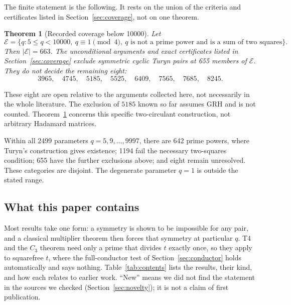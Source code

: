 \documentclass[11pt]{article}
\newtheorem{theorem}{Theorem}[section]
\theoremstyle{definition}
\theoremstyle{remark}
\begin{document}
The finite statement is the following. It rests on the union of the criteria
and certificates listed in Section~\ref{sec:coverage}, not on one theorem.
\begin{theorem}[Recorded coverage below 10000]\label{thm:coverage}
Let
\[
 \mathcal E=\{q:5\le q<10000,\ q\equiv1\pmod4,\ q\text{ is not a prime
 power and is a sum of two squares}\}.
\]
Then $|\mathcal E|=663$. The unconditional arguments and exact certificates
listed in Section~\ref{sec:coverage} exclude symmetric cyclic Turyn pairs at
655 members of $\mathcal E$. They do not decide the remaining eight:
\[
 3965,\quad4745,\quad5185,\quad5525,\quad6409,\quad7565,\quad7685,\quad8245.
\]
\end{theorem}
These eight are open relative to the arguments collected here, not
necessarily in the whole literature. The exclusion of $5185$ known so far
assumes GRH and is not counted. Theorem~\ref{thm:coverage} concerns this
specific two-circulant construction, not arbitrary Hadamard matrices.

Within all 2499 parameters $q=5,9,\ldots,9997$, there are 642 prime powers,
where Turyn's construction gives existence; 1194 fail the necessary
two-squares condition; 655 have the further exclusions above; and eight
remain unresolved. These categories are disjoint. The degenerate parameter
$q=1$ is outside the stated range.

\subsection{What this paper contains}\label{sec:contents}
Most results take one form: a symmetry is shown to be impossible for any
pair, and a classical multiplier theorem then forces that symmetry at
particular $q$. T4 and the $C_3$ theorem need only a prime that divides $t$
exactly once, so they apply to squarefree $t$, where the full-conductor
test of Section~\ref{sec:conductor} holds automatically and says nothing. Table~\ref{tab:contents} lists the results, their kind, and
how each relates to earlier work. ``New'' means we did not find the
statement in the sources we checked (Section~\ref{sec:novelty}); it is not a
claim of first publication.
\end{document}
